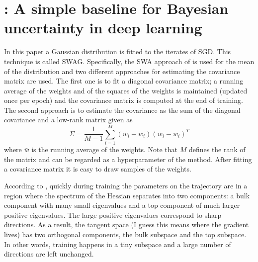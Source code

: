 \section{\textcite{maddox2019simple}: A simple baseline for Bayesian uncertainty in deep learning}

In this paper a Gaussian distribution is fitted to the iterates of SGD.
This technique is called SWAG. 
Specifically, the SWA approach of \textcite{izmailov2019averaging} is used for the mean of the distribution and two different approaches for estimating the covariance matrix are used. 
The first one is to fit a diagonal covariance matrix; a running average of the weights and of the squares of the weights is maintained (updated once per epoch) and the covariance matrix is computed at the end of training. 
The second approach is to estimate the covariance as the sum of the diagonal covariance and a low-rank matrix given as
\begin{equation}
	\Sigma = \frac{1}{M-1}\sum_{i=1}^{M}(w_i-\bar{w}_i)(w_i-\bar{w}_i)^T
\end{equation}
where $\bar{w}$ is the running average of the weights.
Note that $M$ defines the rank of the matrix and can be regarded as a hyperparameter of the method.
After fitting a covariance matrix it is easy to draw samples of the weights. 

According to \textcite{gur-ari2018gradient}, quickly during training the parameters on the trajectory are in a region where the spectrum of the Hessian separates into two components: a bulk component with many small eigenvalues and a top component of much larger positive eigenvalues. 
The large positive eigenvalues correspond to sharp directions. 
As a result, the tangent space (I guess this means where the gradient lives) has two orthogonal components, the bulk subspace and the top subspace. 
In other words, training happens in a tiny subspace and a large number of directions are left unchanged. 

